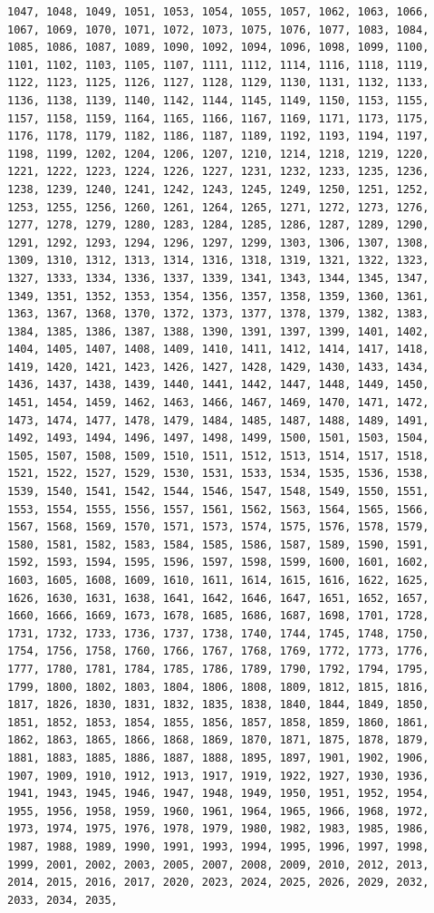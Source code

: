 \documentclass[a4paper, nobind]{templates/ociamthesis}
\begin{document}
\begin{verbatim}
1047, 1048, 1049, 1051, 1053, 1054, 1055, 1057, 1062, 1063, 1066, 1067, 1069, 1070, 1071, 1072, 1073, 1075, 1076, 1077, 1083, 1084, 1085, 1086, 1087, 1089, 1090, 1092, 1094, 1096, 1098, 1099, 1100, 1101, 1102, 1103, 1105, 1107, 1111, 1112, 1114, 1116, 1118, 1119, 1122, 1123, 1125, 1126, 1127, 1128, 1129, 1130, 1131, 1132, 1133, 1136, 1138, 1139, 1140, 1142, 1144, 1145, 1149, 1150, 1153, 1155, 1157, 1158, 1159, 1164, 1165, 1166, 1167, 1169, 1171, 1173, 1175, 1176, 1178, 1179, 1182, 1186, 1187, 1189, 1192, 1193, 1194, 1197, 1198, 1199, 1202, 1204, 1206, 1207, 1210, 1214, 1218, 1219, 1220, 1221, 1222, 1223, 1224, 1226, 1227, 1231, 1232, 1233, 1235, 1236, 1238, 1239, 1240, 1241, 1242, 1243, 1245, 1249, 1250, 1251, 1252, 1253, 1255, 1256, 1260, 1261, 1264, 1265, 1271, 1272, 1273, 1276, 1277, 1278, 1279, 1280, 1283, 1284, 1285, 1286, 1287, 1289, 1290, 1291, 1292, 1293, 1294, 1296, 1297, 1299, 1303, 1306, 1307, 1308, 1309, 1310, 1312, 1313, 1314, 1316, 1318, 1319, 1321, 1322, 1323, 1327, 1333, 1334, 1336, 1337, 1339, 1341, 1343, 1344, 1345, 1347, 1349, 1351, 1352, 1353, 1354, 1356, 1357, 1358, 1359, 1360, 1361, 1363, 1367, 1368, 1370, 1372, 1373, 1377, 1378, 1379, 1382, 1383, 1384, 1385, 1386, 1387, 1388, 1390, 1391, 1397, 1399, 1401, 1402, 1404, 1405, 1407, 1408, 1409, 1410, 1411, 1412, 1414, 1417, 1418, 1419, 1420, 1421, 1423, 1426, 1427, 1428, 1429, 1430, 1433, 1434, 1436, 1437, 1438, 1439, 1440, 1441, 1442, 1447, 1448, 1449, 1450, 1451, 1454, 1459, 1462, 1463, 1466, 1467, 1469, 1470, 1471, 1472, 1473, 1474, 1477, 1478, 1479, 1484, 1485, 1487, 1488, 1489, 1491, 1492, 1493, 1494, 1496, 1497, 1498, 1499, 1500, 1501, 1503, 1504, 1505, 1507, 1508, 1509, 1510, 1511, 1512, 1513, 1514, 1517, 1518, 1521, 1522, 1527, 1529, 1530, 1531, 1533, 1534, 1535, 1536, 1538, 1539, 1540, 1541, 1542, 1544, 1546, 1547, 1548, 1549, 1550, 1551, 1553, 1554, 1555, 1556, 1557, 1561, 1562, 1563, 1564, 1565, 1566, 1567, 1568, 1569, 1570, 1571, 1573, 1574, 1575, 1576, 1578, 1579, 1580, 1581, 1582, 1583, 1584, 1585, 1586, 1587, 1589, 1590, 1591, 1592, 1593, 1594, 1595, 1596, 1597, 1598, 1599, 1600, 1601, 1602, 1603, 1605, 1608, 1609, 1610, 1611, 1614, 1615, 1616, 1622, 1625, 1626, 1630, 1631, 1638, 1641, 1642, 1646, 1647, 1651, 1652, 1657, 1660, 1666, 1669, 1673, 1678, 1685, 1686, 1687, 1698, 1701, 1728, 1731, 1732, 1733, 1736, 1737, 1738, 1740, 1744, 1745, 1748, 1750, 1754, 1756, 1758, 1760, 1766, 1767, 1768, 1769, 1772, 1773, 1776, 1777, 1780, 1781, 1784, 1785, 1786, 1789, 1790, 1792, 1794, 1795, 1799, 1800, 1802, 1803, 1804, 1806, 1808, 1809, 1812, 1815, 1816, 1817, 1826, 1830, 1831, 1832, 1835, 1838, 1840, 1844, 1849, 1850, 1851, 1852, 1853, 1854, 1855, 1856, 1857, 1858, 1859, 1860, 1861, 1862, 1863, 1865, 1866, 1868, 1869, 1870, 1871, 1875, 1878, 1879, 1881, 1883, 1885, 1886, 1887, 1888, 1895, 1897, 1901, 1902, 1906, 1907, 1909, 1910, 1912, 1913, 1917, 1919, 1922, 1927, 1930, 1936, 1941, 1943, 1945, 1946, 1947, 1948, 1949, 1950, 1951, 1952, 1954, 1955, 1956, 1958, 1959, 1960, 1961, 1964, 1965, 1966, 1968, 1972, 1973, 1974, 1975, 1976, 1978, 1979, 1980, 1982, 1983, 1985, 1986, 1987, 1988, 1989, 1990, 1991, 1993, 1994, 1995, 1996, 1997, 1998, 1999, 2001, 2002, 2003, 2005, 2007, 2008, 2009, 2010, 2012, 2013, 2014, 2015, 2016, 2017, 2020, 2023, 2024, 2025, 2026, 2029, 2032, 2033, 2034, 2035, 
\end{verbatim}
\end{document}

